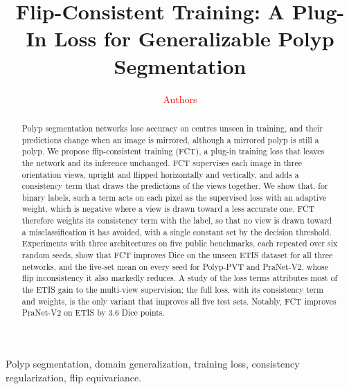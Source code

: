 \documentclass[journal]{IEEEtran}
\newcommand{\pend}[1]{\textcolor{red}{#1}}
\begin{document}
\title{Flip-Consistent Training: A Plug-In Loss for Generalizable Polyp Segmentation}
\author{\pend{Authors}}
\maketitle

\begin{abstract}
Polyp segmentation networks lose accuracy on centres unseen in training, and their predictions change
when an image is mirrored, although a mirrored polyp is still a polyp. We propose flip-consistent
training (FCT), a plug-in training loss that leaves the network and its inference unchanged. FCT
supervises each image in three orientation views, upright and flipped horizontally and vertically,
and adds a consistency term that draws the predictions of the views together. We show that, for
binary labels, such a term acts on each pixel as the supervised loss with an adaptive weight, which
is negative where a view is drawn toward a less accurate one. FCT therefore weights its consistency
term with the label, so that no view is drawn toward a misclassification it has avoided, with a
single constant set by the decision threshold. Experiments with three architectures on five public
benchmarks, each repeated over six random seeds, show that FCT improves Dice on the unseen ETIS
dataset for all three networks, and the five-set mean on every seed for Polyp-PVT and PraNet-V2,
whose flip inconsistency it also markedly reduces. A study of the loss terms attributes most of the
ETIS gain to the multi-view supervision; the full loss, with its consistency term and weights, is the
only variant that improves all five test sets. Notably, FCT improves PraNet-V2 on ETIS by 3.6 Dice
points.
\end{abstract}

\begin{IEEEkeywords}
Polyp segmentation, domain generalization, training loss, consistency regularization, flip
equivariance.
\end{IEEEkeywords}














\end{document}
